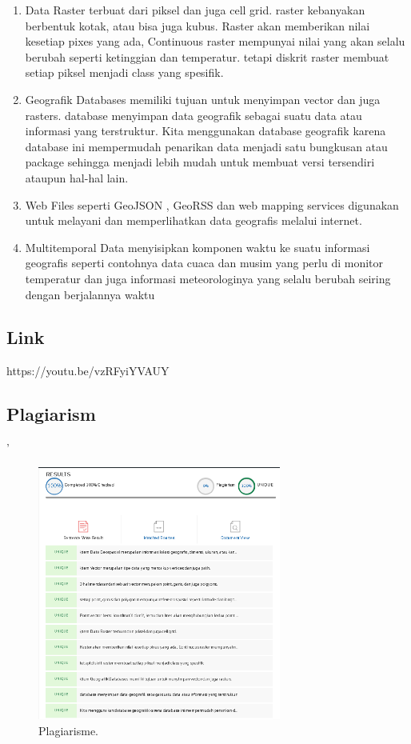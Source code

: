 \begin{itemize}
\begin{enumerate}
	\item Data Raster terbuat dari piksel dan juga cell grid. raster kebanyakan berbentuk kotak, atau bisa juga kubus. Raster akan memberikan nilai kesetiap pixes yang ada, Continuous raster mempunyai nilai yang akan selalu berubah seperti ketinggian dan temperatur. tetapi diskrit raster membuat setiap piksel menjadi class yang spesifik.
	\item Geografik Databases memiliki tujuan untuk menyimpan vector dan juga rasters. database menyimpan data geografik sebagai suatu data atau informasi yang terstruktur. Kita menggunakan database geografik karena database ini mempermudah penarikan data menjadi satu bungkusan atau package sehingga menjadi lebih mudah untuk membuat versi tersendiri ataupun hal-hal lain.
	\item Web Files seperti GeoJSON , GeoRSS dan web mapping services digunakan untuk melayani dan memperlihatkan data geografis melalui internet.
	\item Multitemporal Data menyisipkan komponen waktu ke suatu informasi geografis seperti contohnya data cuaca dan musim yang perlu di monitor temperatur dan juga informasi meteorologinya yang selalu berubah seiring dengan berjalannya waktu


	\end{enumerate}
\end{itemize}

\subsection{Link}
https://youtu.be/vzRFyiYVAUY
\subsection{Plagiarism}'\begin{figure}[H]
	\includegraphics[width=8cm]{figures/Tugas1/1174079/plagiarisme.png}
	\centering
	\caption{Plagiarisme.}
\end{figure}	

